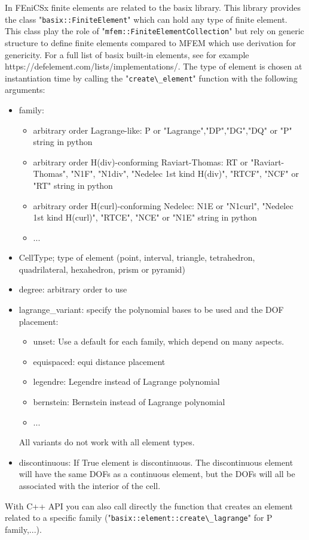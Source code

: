 \documentclass[12pt]{article}
\newcommand{\f}[1]{FEniCSx#1}
\newcommand{\mycode}[1]{\textsf{"}\lstinline`#1`\textsf{"}}
\begin{document}
In \f{} finite elements are related to the basix library. This library provides the class \mycode{basix::FiniteElement} which can hold any type of finite element. This class play the role of \mycode{mfem::FiniteElementCollection} but rely on generic structure to define finite elements compared to MFEM which use derivation for genericity. For a full list of basix built-in elements, see for example https://defelement.com/lists/implementations/. The type of element is chosen at instantiation time by calling the  \mycode{create\_element} function with the following arguments:
\begin{itemize}
	\item family: \begin{itemize}
		\item arbitrary order Lagrange-like: P or "Lagrange","DP","DG","DQ" or "P" string in python
		\item arbitrary order H(div)-conforming Raviart-Thomas: RT or "Raviart-Thomas", "N1F", "N1div", "Nedelec 1st kind H(div)", "RTCF", "NCF" or "RT" string in python
		\item arbitrary order H(curl)-conforming Nedelec: N1E or "N1curl", "Nedelec 1st kind H(curl)", "RTCE", "NCE" or "N1E" string in python
		\item ...
	\end{itemize}
	\item CellType; type of element (point, interval, triangle, tetrahedron,
	quadrilateral, hexahedron, prism or pyramid)
	\item degree: arbitrary order to use
	\item lagrange\_variant: specify the polynomial bases to be used and the DOF placement:
	\begin{itemize}
		\item unset: Use a default for each family, which depend on many aspects.
		\item equispaced: equi distance placement
		\item legendre: Legendre instead of Lagrange polynomial
		\item bernstein: Bernstein instead of Lagrange polynomial
		\item ...
	\end{itemize}All variants do not work with all element types. 
	\item discontinuous: If True element is discontinuous. The discontinuous element will have the same DOFs as a continuous element, but the DOFs will all be associated with the interior of the cell. 
\end{itemize}
With C++ API you can also call directly the function that creates an element related to a specific family (\mycode{basix::element::create\_lagrange} for P family,...). 
\end{document}
